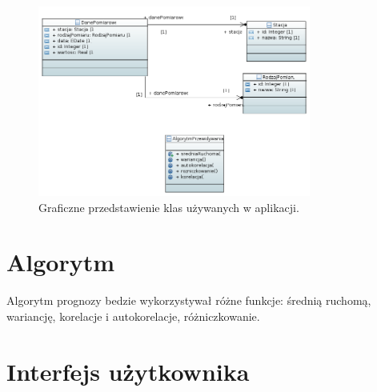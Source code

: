 \documentclass[11pt, a4paper, oneside]{mwart}
\begin{document}
\begin{figure}[htbp]
  \centering
  \includegraphics[width=0.8\textwidth]{./uml}
  \caption{Graficzne przedstawienie klas używanych w aplikacji.}
  \label{fig:diagram_uml}
\end{figure}

\section{Algorytm}

Algorytm prognozy bedzie wykorzystywał różne funkcje: średnią ruchomą, wariancję, korelacje i autokorelacje, różniczkowanie.


\section{Interfejs użytkownika}
\end{document}
